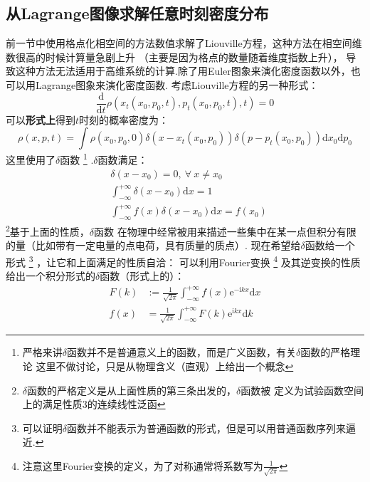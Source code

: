     \subsection{从Lagrange图像求解任意时刻密度分布}
    前一节中使用格点化相空间的方法数值求解了Liouville方程，这种方法在相空间维数很高的时候计算量急剧上升
    （主要是因为格点的数量随着维度指数上升），
    导致这种方法无法适用于高维系统的计算.除了用Euler图象来演化密度函数以外，也可以用Lagrange图象来演化密度函数.
    考虑Liouville方程的另一种形式：
    \begin{equation}
        \frac {\mathrm{d}}{\mathrm{d}t} \rho(x_t(x_0, p_0, t),p_t(x_0, p_0, t),t) = 0
    \end{equation}
    可以\textbf{形式上}得到$t$时刻的概率密度为：
    \begin{equation}
        \rho(x,p,t) = \int \rho(x_0,p_0,0)\delta(x-x_t(x_0,p_0)) \delta(p-p_t(x_0,p_0)) \mathrm{d}x_0\mathrm{d}p_0
        \label{formal solution}
    \end{equation}
    这里使用了$\delta$函数
    \footnote{
        严格来讲$\delta$函数并不是普通意义上的函数，而是广义函数，有关$\delta$函数的严格理论
        这里不做讨论，只是从物理含义（直观）上给出一个概念
    }
    .$\delta$函数满足：
    \begin{equation}
        \begin{split}
        &\delta(x-x_0) = 0, \ \forall \ x \neq x_0\\
        &\int_{-\infty}^{+\infty} \delta(x-x_0) \mathrm{d}x = 1\\
        &\int_{-\infty}^{+\infty} f(x)\delta(x-x_0) \mathrm{d}x = f(x_0)
        \end{split}
        \label{delta function}
    \end{equation}
    \footnote{$\delta$函数的严格定义是从上面性质的第三条出发的，$\delta$函数被
    定义为试验函数空间上的满足性质3的连续线性泛函}基于上面的性质，$\delta$函数
    在物理中经常被用来描述一些集中在某一点但积分有限的量（比如带有一定电量的点电荷，具有质量的质点）.
    现在希望给$\delta$函数给一个形式
    \footnote{
        可以证明$\delta$函数并不能表示为普通函数的形式，但是可以用普通函数序列来逼近.
    }
    ，让它和上面满足的性质自洽：
    可以利用Fourier变换
    \footnote{注意这里Fourier变换的定义，为了对称通常将系数写为$\frac{1}{\sqrt{2\pi}}$}
    及其逆变换的性质给出一个积分形式的$\delta$函数（形式上的）：
    \begin{equation}
        \begin{split}
            F(k) &:= \frac 1{\sqrt{2\pi}} \int_{-\infty}^{+\infty} f(x)\mathrm{e}^{-\mathrm{i}kx}\mathrm{d}x\\
            f(x) &= \frac 1{\sqrt{2\pi}} \int_{-\infty}^{+\infty} F(k)\mathrm{e}^{\mathrm{i}kx}\mathrm{d}k
        \end{split}
        \label{fourier transform}
    \end{equation}
